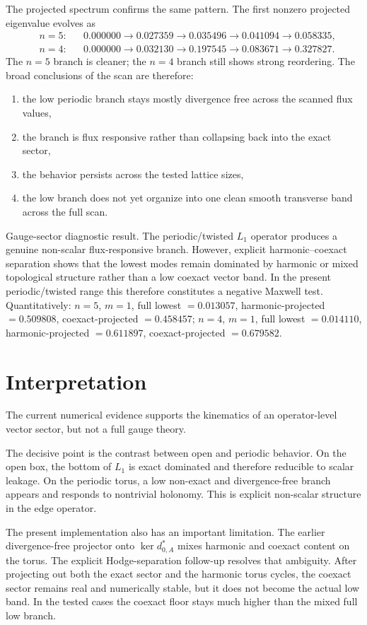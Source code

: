 \documentclass[11pt]{article}
\begin{document}
The projected spectrum confirms the same pattern. The first nonzero projected eigenvalue evolves as
\begin{align}
&n=5: && 0.000000 \to 0.027359 \to 0.035496 \to 0.041094 \to 0.058335, \\
&n=4: && 0.000000 \to 0.032130 \to 0.197545 \to 0.083671 \to 0.327827.
\end{align}
The $n=5$ branch is cleaner; the $n=4$ branch still shows strong reordering. The broad conclusions of the scan are therefore:
\begin{enumerate}
\item the low periodic branch stays mostly divergence free across the scanned flux values,
\item the branch is flux responsive rather than collapsing back into the exact sector,
\item the behavior persists across the tested lattice sizes,
\item the low branch does not yet organize into one clean smooth transverse band across the full scan.
\end{enumerate}

Gauge-sector diagnostic result. The periodic/twisted $L_1$ operator produces a genuine non-scalar flux-responsive branch. However, explicit harmonic--coexact separation shows that the lowest modes remain dominated by harmonic or mixed topological structure rather than a low coexact vector band. In the present periodic/twisted range this therefore constitutes a negative Maxwell test. Quantitatively: $n=5$, $m=1$, full lowest $=0.013057$, harmonic-projected $=0.509808$, coexact-projected $=0.458457$; $n=4$, $m=1$, full lowest $=0.014110$, harmonic-projected $=0.611897$, coexact-projected $=0.679582$.

\section{Interpretation}
The current numerical evidence supports the kinematics of an operator-level vector sector, but not a full gauge theory.

The decisive point is the contrast between open and periodic behavior. On the open box, the bottom of $L_1$ is exact dominated and therefore reducible to scalar leakage. On the periodic torus, a low non-exact and divergence-free branch appears and responds to nontrivial holonomy. This is explicit non-scalar structure in the edge operator.

The present implementation also has an important limitation. The earlier divergence-free projector onto $\ker d_{0,A}^*$ mixes harmonic and coexact content on the torus. The explicit Hodge-separation follow-up resolves that ambiguity. After projecting out both the exact sector and the harmonic torus cycles, the coexact sector remains real and numerically stable, but it does not become the actual low band. In the tested cases the coexact floor stays much higher than the mixed full low branch.
\end{document}
